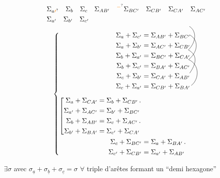 
\[
 \begin{aligned}
 &\Sigma_{a\unsure{\prime}}\quad\Sigma_b\quad\Sigma_c\quad\Sigma_{AB'}\quad{}^{\unsure{-}}\Sigma_{BC'}\quad\Sigma_{CB'}\quad\Sigma_{CA'}\quad\Sigma_{AC'}\\
 &\Sigma_{a'}\quad\Sigma_{b'}\quad\Sigma_{c'}
 \end{aligned}
\]

\[
 \left\{\begin{aligned}
 \Sigma_a+\Sigma_{c'}&=\Sigma_{AB'}+\Sigma_{BC'}\\
 \Sigma_a+\Sigma_{b'}&=\Sigma_{AC'}+\Sigma_{CB'}\\
 \Sigma_b+\Sigma_{a'}&=\Sigma_{BC'}+\Sigma_{CA'}\\
 \Sigma_b+\Sigma_{c'}&=\Sigma_{BA'}+\Sigma_{AC'}\\
 \Sigma_c+\Sigma_{b'}&=\Sigma_{CA'}+\Sigma_{AB'}\\
 \Sigma_c+\Sigma_{a'}&=\Sigma_{CB'}+\Sigma_{BA'}\\[5pt]
 \left[\begin{aligned}
 \Sigma_a+\Sigma_{CA'}&=\Sigma_b+\Sigma_{CB'}\,.\\
 \Sigma_{a'}+\Sigma_{AC'}&=\Sigma_{b'}+\Sigma_{BC'}\\
 \Sigma_b+\Sigma_{AB'}&=\Sigma_c+\Sigma_{AC'}\,.\\
 \Sigma_{b'}+\Sigma_{BA'}&=\Sigma_{c'}+\Sigma_{CA'}
 \end{aligned}\right.&\\
 \Sigma_c+\Sigma_{BC'}&=\Sigma_a+\Sigma_{BA'}\,.\\
 \Sigma_{c'}+\Sigma_{CB'}&=\Sigma_{a'}+\Sigma_{AB'}
 \end{aligned}\right.
 \quad\vcenter{\hbox{\begin{tikzpicture}[overlay]
 \draw (-.5,3.5) .. controls (-.12,3.27) and (-.12,2.7) .. (-.55,2.28) .. controls (-.04,2.0) and (-.15,1.55) .. (-.48,1.08);
 \draw (-.49,3.06) .. controls (0,2.81) and (-.03,2.18) .. (-.54,1.78) .. controls (.05,1.53) and (.02,.76) .. (-.4,.44);
 \end{tikzpicture}}}
\]

$\exists\sigma$ avec $\sigma_{\underline a}+\sigma_{\underline b}+\sigma_{\underline c}=\sigma$ $\forall$ triple d'arêtes formant un ``demi hexagone''


